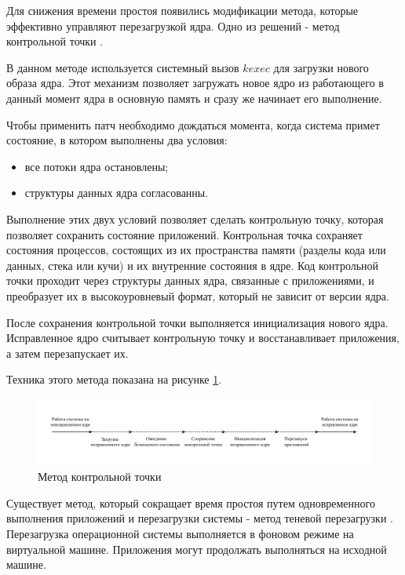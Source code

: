Для снижения времени простоя появились модификации метода, которые эффективно управляют перезагрузкой ядра. Одно из решений - метод контрольной точки \cite{kup}.

В данном методе используется системный вызов $kexec$  \cite{seamless} для загрузки нового образа ядра. Этот механизм позволяет загружать новое ядро из работающего в данный момент ядра в основную память и сразу же начинает его выполнение.

Чтобы применить патч необходимо дождаться момента, когда система примет состояние, в котором выполнены два условия:
\begin{itemize}
	\item все потоки ядра остановлены;
	\item структуры данных ядра согласованны.
\end{itemize}

Выполнение этих двух условий позволяет сделать контрольную точку, которая позволяет сохранить состояние приложений. Контрольная точка сохраняет состояния процессов, состоящих из их пространства памяти (разделы кода или данных, стека или кучи)
и их внутренние состояния в ядре. Код контрольной точки проходит через структуры данных ядра, связанные с приложениями, и преобразует их в высокоуровневый формат, который не зависит от версии ядра. 

После сохранения контрольной точки выполняется инициализация нового ядра. Исправленное ядро считывает контрольную точку и восстанавливает приложения, а затем перезапускает их.

Техника этого метода показана на рисунке \ref{img:checkpoint}.

\begin{figure}[H]
	\begin{center}
		\includegraphics[scale=0.7]{img/checkpoint.pdf}
	\end{center}
	\captionsetup{justification=centering}
	\caption{Метод контрольной точки}
	\label{img:checkpoint}
\end{figure}

Существует метод, который сокращает время простоя путем одновременного выполнения приложений и перезагрузки системы - метод теневой перезагрузки \cite{shadow}. Перезагрузка операционной системы выполняется в фоновом режиме на виртуальной машине. Приложения могут продолжать выполняться на исходной машине.


